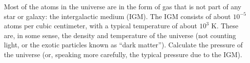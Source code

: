 Most of the atoms in the universe are in the form of gas that is not
part of any star or galaxy: the intergalactic medium (IGM). The IGM
consists of about $10^{-5}$ atoms per cubic
centimeter, with a typical temperature of about $10^3$ K.
These are, in some sense, the density and temperature of
the universe (not counting light, or the exotic particles known
as ``dark matter''). Calculate the pressure of the universe
(or, speaking more carefully, the typical pressure due to
the IGM).\answercheck
